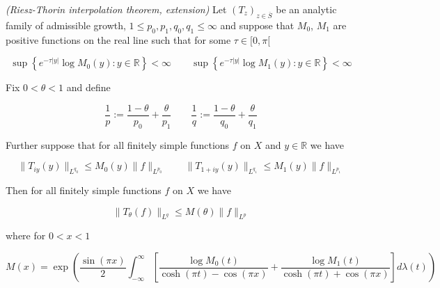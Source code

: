 \vspace{2mm}

\begin{mdframed}
	\begin{theorem}\emph{(Riesz-Thorin interpolation theorem, extension)}
		Let $\left( T_z \right)_{z \in \overline{S}}$ be an analytic family of admissible growth, $1 \leqslant p_0,p_1,q_0,q_1 \leqslant \infty$ and suppose that $M_0$, $M_1$ are positive functions on the real line such that for some $\tau \in [0,\pi[$

			\begin{equation}
				\sup\left\{e^{-\tau \vert y \vert} \log M_0(y) : y \in \mathbb{R}\right\} < \infty \qquad \sup\left\{e^{-\tau \vert y \vert} \log M_1(y) : y \in \mathbb{R}\right\} < \infty
			\end{equation}

			Fix $0 < \theta < 1$ and define

			\begin{equation}
				\frac{1}{p} := \frac{1 - \theta}{p_0} + \frac{\theta}{p_1} \qquad \frac{1}{q} := \frac{1 - \theta}{q_0} + \frac{\theta}{q_1}
			\end{equation}

			Further suppose that for all finitely simple functions $f$ on $X$ and $y \in \mathbb{R}$ we have

			\begin{equation}
				\|T_{iy}(y)\|_{L^{q_0}} \leqslant M_0(y)\|f\|_{L^{p_0}} \qquad \|T_{1 + iy}(y)\|_{L^{q_1}} \leqslant M_1(y)\|f\|_{L^{p_1}} 
			\end{equation}

			Then for all finitely simple functions $f$ on $X$ we have

			\begin{equation*}
				\|T_\theta(f)\|_{L^q} \leqslant M(\theta)\|f\|_{L^p}
			\end{equation*}

			where for $0 < x < 1$

			\begin{equation*}
				M(x) = \exp\left( \frac{\sin(\pi x)}{2} \int_{-\infty}^\infty \left[ \frac{\log M_0(t)}{\cosh(\pi t) - \cos(\pi x)} + \frac{\log M_1(t)}{\cosh(\pi t) + \cos(\pi x)}\right] d\lambda(t) \right)
			\end{equation*}
	\end{theorem}
\end{mdframed}

